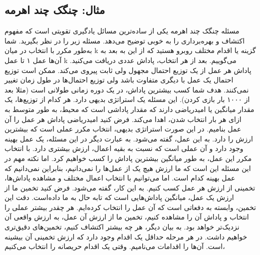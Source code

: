 \subsection{مثال: چنگک چند اهرمه}
مسئله چنگک چند اهرمه یکی از ساده‌ترین مسائل یادگیری تقویتی است که مفهوم اکتشاف و بهره‌برداری را به خوبی توضیح می‌دهد. مسئله زیر را در نظر بگیرید. شما به‌طور مکرر با انتخاب در میان k گزینه یا اقدام مختلف روبرو هستید که از این به بعد به آن‌ها عمل ۱ تا عمل k می‌گوییم. بعد از هر انتخاب، پاداش عددی دریافت می‌کنید. پاداش هر عمل از یک توزیع احتمال مجهول ولی ثابت پیروی می‌کند. ممکن است توزیع احتمال یک عمل با دیگری متفاوت باشد ولی توزیع احتمال‌ها در طول زمان تغییر نمی‌کنند. هدف شما کسب بیشترین پاداش، در یک دوره زمانی طولانی است (مثلا بعد از ۱۰۰۰ بار بازی کردن). 
 این مسئله یک استراتژی بدیهی دارد. هر کدام از توزیع‌ها، یک مقدار میانگین یا امیدریاضی دارند که مقدار پاداشی است که محیط، به طور متوسط به ازای هر بار انتخاب شدن، اهدا می‌کند. فرض کنید امیدریاضی پاداش هر عمل را  آن عمل بنامیم. در این صورت استراتژی بدیهی، انتخاب مکرر عملی است که بیشترین ارزش را دارد. به این عمل، 
 گفته می‌شود. به عبارت دیگر در این مسئله، یک عمل بهینه وجود دارد و آن عملی است که نسبت به بقیه اعمال، ارزش بیشتری دارد. با انتخاب مکرر این عمل، به طور میانگین بیشترین پاداش را کسب خواهیم کرد. اما نکته مهم در این مسئله این است که ما ارزش هیچ یک از عمل‌ها را نمی‌دانیم، بنابراین نمی‌دانیم که عمل بهینه کدام است. اما می‌توانیم با انتخاب اعمال مختلف و مشاهده پاداش‌ها، تخمینی از ارزش هر عمل کسب کنیم. به این کار،  گفته می‌شود. فرض کنید تخمین ما از ارزش یک عمل، میانگین پاداش‌هایی است که تابه حال به ما داده‌است. دقت این تخمین، وابسته به دفعاتی است که آن عمل را انتخاب کرده‌ایم. هر چقدر بیشتر عملی را انتخاب و پاداش آن را مشاهده کنیم، تخمین ما از ارزش آن عمل، به ارزش واقعی آن نزدیک‌تر خواهد بود. به بیان دیگر، هر چه بیشتر اکتشاف کنیم، تخمین‌های دقیق‌تری خواهیم داشت.
در هر مرحله حداقل یک اقدام وجود دارد
که ارزش تخمینی آن بیشینه است. آن‌ها را اقدامات  می‌نامیم. وقتی یک اقدام حریصانه را انتخاب می‌کنیم،
